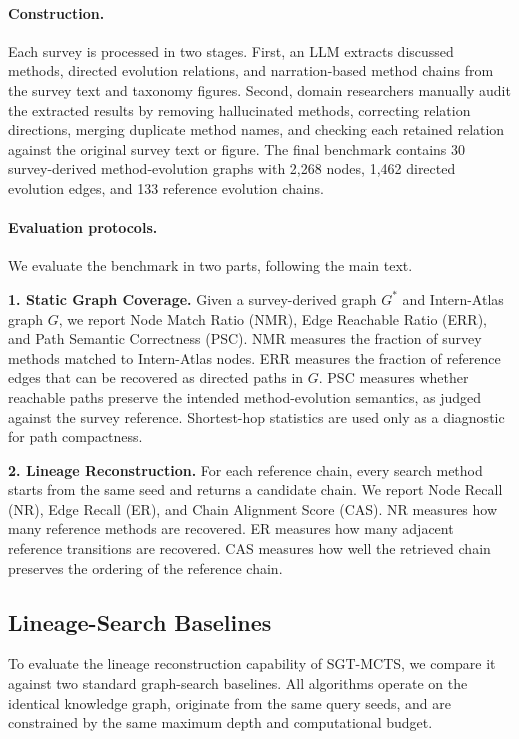\documentclass{opendatalab}
\begin{document}
\paragraph{Construction.}
Each survey is processed in two stages. First, an LLM extracts discussed methods, directed evolution relations, and narration-based method chains from the
survey text and taxonomy figures. Second, domain researchers manually audit the extracted results by removing hallucinated methods, correcting relation
directions, merging duplicate method names, and checking each retained relation against the original survey text or figure. The final benchmark contains 30
survey-derived method-evolution graphs with 2,268 nodes, 1,462 directed evolution edges, and 133 reference evolution chains.

\paragraph{Evaluation protocols.}
We evaluate the benchmark in two parts, following the main text.

\textbf{1. Static Graph Coverage.}
Given a survey-derived graph $G^\ast$ and Intern-Atlas graph $G$, we report Node Match Ratio (NMR), Edge Reachable Ratio (ERR), and Path Semantic
Correctness (PSC). NMR measures the fraction of survey methods matched to Intern-Atlas nodes. ERR measures the fraction of reference edges that can be
recovered as directed paths in $G$. PSC measures whether reachable paths preserve the intended method-evolution semantics, as judged against the survey
reference. Shortest-hop statistics are used only as a diagnostic for path compactness.

\textbf{2. Lineage Reconstruction.}
For each reference chain, every search method starts from the same seed and returns a candidate chain. We report Node Recall (NR), Edge Recall (ER), and
Chain Alignment Score (CAS). NR measures how many reference methods are recovered. ER measures how many adjacent reference transitions are recovered. CAS
measures how well the retrieved chain preserves the ordering of the reference chain.

\subsection{Lineage-Search Baselines}
\label{app:search-baselines}

To evaluate the lineage reconstruction capability of SGT-MCTS, we compare it against two standard graph-search baselines. All algorithms operate on the identical knowledge graph, originate from the same query seeds, and are constrained by the same maximum depth and computational budget. 
\end{document}
